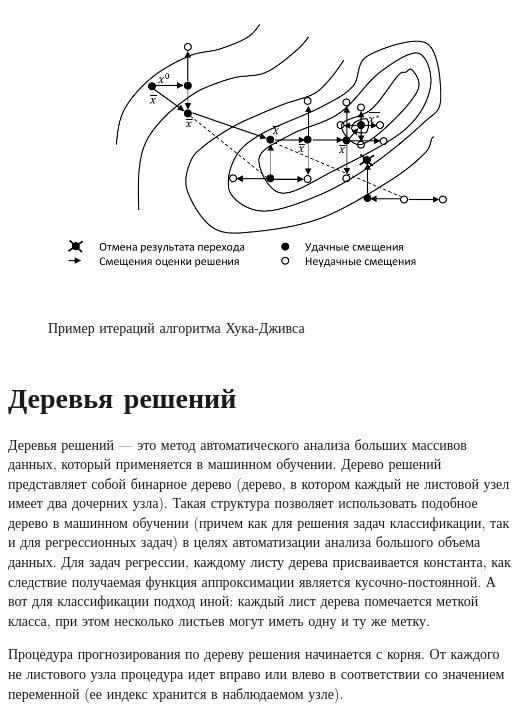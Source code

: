 \documentclass[12pt, a4paper, russian]{article}
\begin{document}
 \begin{figure}[!h]
	\begin{center}
		\begin{minipage}[h]{0.8\linewidth}
			\includegraphics[width=1\linewidth]{figure/fig1.pdf}
			\caption{Пример итераций алгоритма Хука-Дживса} %
			\label{fig:fig1}
		\end{minipage}
	\end{center}
 \end{figure}	

\section{Деревья решений}

Деревья решений --- это метод автоматического анализа больших массивов данных, который применяется в машинном обучении. Дерево решений представляет собой бинарное дерево (дерево, в котором каждый не листовой узел имеет два дочерних узла). Такая структура позволяет использовать подобное дерево в машинном обучении (причем как для решения задач классификации, так и для регрессионных задач) в целях автоматизации анализа большого объема данных. Для задач регрессии, каждому листу дерева присваивается константа, как следствие  получаемая функция аппроксимации является кусочно-постоянной. А вот для классификации подход иной: каждый лист дерева помечается меткой класса, при этом несколько листьев могут иметь одну и ту же метку. 

Процедура прогнозирования по дереву решения начинается с корня. От каждого не листового узла процедура идет вправо или влево в соответствии со значением переменной (ее индекс хранится в наблюдаемом узле). 
\end{document}
